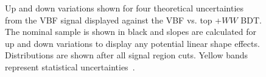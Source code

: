 \begin{figure}[!h]
  \hfill
  \hfill
  \hfill
  \hfill
{\caption{Up and down variations shown for four theoretical uncertainties from the VBF signal displayed against the VBF vs. top +$WW$ BDT. The nominal sample is shown in black and slopes are calculated for up and down variations to display any potential linear shape effects. Distributions are shown after all signal region cuts. Yellow bands represent statistical uncertainties~\cite{ourSupportNote}.
\label{fig:vbftheor}}}
\end{figure} 

